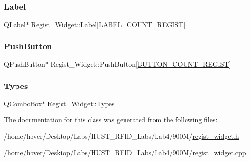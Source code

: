 \subsubsection{\texorpdfstring{Label}{Label}}
{\footnotesize\ttfamily Q\+Label$\ast$ Regist\+\_\+\+Widget\+::\+Label\mbox{[}\mbox{\hyperlink{regist__widget_8h_a6a4fa301fef4592554a274b47ca75bab}{L\+A\+B\+E\+L\+\_\+\+C\+O\+U\+N\+T\+\_\+\+R\+E\+G\+I\+ST}}\mbox{]}\hspace{0.3cm}{\ttfamily [private]}}

\mbox{\label{class_regist___widget_acb1651371b04b2020df957386cd92f66}} 
\subsubsection{\texorpdfstring{PushButton}{PushButton}}
{\footnotesize\ttfamily Q\+Push\+Button$\ast$ Regist\+\_\+\+Widget\+::\+Push\+Button\mbox{[}\mbox{\hyperlink{regist__widget_8h_a2e0586e9b6994b0bc0688ed11bbc7eba}{B\+U\+T\+T\+O\+N\+\_\+\+C\+O\+U\+N\+T\+\_\+\+R\+E\+G\+I\+ST}}\mbox{]}\hspace{0.3cm}{\ttfamily [private]}}

\mbox{\label{class_regist___widget_a4d510f05b4b33c36c40c01601e120775}} 
\subsubsection{\texorpdfstring{Types}{Types}}
{\footnotesize\ttfamily Q\+Combo\+Box$\ast$ Regist\+\_\+\+Widget\+::\+Types\hspace{0.3cm}{\ttfamily [private]}}



The documentation for this class was generated from the following files\+:\begin{DoxyCompactItemize}
\item 
/home/hover/\+Desktop/\+Labs/\+H\+U\+S\+T\+\_\+\+R\+F\+I\+D\+\_\+\+Labs/\+Lab4/900\+M/\mbox{\hyperlink{regist__widget_8h}{regist\+\_\+widget.\+h}}\item 
/home/hover/\+Desktop/\+Labs/\+H\+U\+S\+T\+\_\+\+R\+F\+I\+D\+\_\+\+Labs/\+Lab4/900\+M/\mbox{\hyperlink{regist__widget_8cpp}{regist\+\_\+widget.\+cpp}}\end{DoxyCompactItemize}

